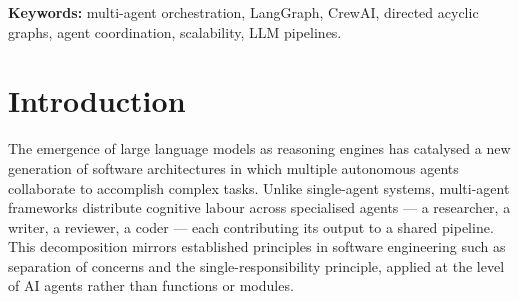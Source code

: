 \documentclass[12pt,a4paper]{article}
\begin{document}
\begin{abstract}
\noindent
The proliferation of large language model (LLM)-powered applications has driven
demand for robust, scalable multi-agent orchestration frameworks. Among the most
prominent solutions are LangGraph and CrewAI --- two frameworks that take
fundamentally different architectural approaches to coordinating autonomous AI
agents. This paper presents a comprehensive comparative analysis evaluating both
frameworks across seven dimensions: architectural design, state management
strategy, tool integration, scalability, developer experience, community
maturity, and real-world applicability.

LangGraph adopts a graph-theoretic approach, modelling agent workflows as
directed acyclic graphs (DAGs) with explicit state transitions. CrewAI employs
a team-coordination metaphor in which agents assume human-like roles, delegating
tasks hierarchically under a configurable process model. Through formal
complexity analysis, structured comparison, and evaluation against documented
real-world deployment patterns, this study provides practitioners with
principled guidance for selecting the appropriate framework for their
multi-agent system requirements.
\end{abstract}

\bigskip
\noindent\textbf{Keywords:} multi-agent orchestration, LangGraph, CrewAI,
directed acyclic graphs, agent coordination, scalability, LLM pipelines.

\newpage

\section{Introduction}

The emergence of large language models as reasoning engines has catalysed a new
generation of software architectures in which multiple autonomous agents
collaborate to accomplish complex tasks. Unlike single-agent systems,
multi-agent frameworks distribute cognitive labour across specialised agents ---
a researcher, a writer, a reviewer, a coder --- each contributing its output to
a shared pipeline. This decomposition mirrors established principles in software
engineering such as separation of concerns and the single-responsibility
principle, applied at the level of AI agents rather than functions or modules.
\end{document}
